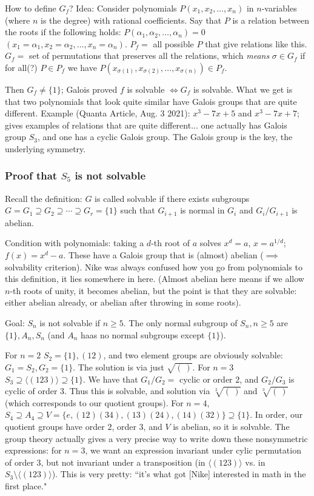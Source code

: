 \documentclass{article}
\theoremstyle{plain}
\theoremstyle{remark}
\begin{document}
How to define $G_f$?
Idea: Consider polynomials $P(x_1,x_2,\dots,x_n)$ in $n$-variables
(where $n$ is the degree) with rational coefficients.
Say that $P$ is a relation between the roots if the following holds:
$P(\alpha_1,\alpha_2,\dots,\alpha_n) = 0$ $(x_1=\alpha_1,x_2=\alpha_2,\dots,x_n=\alpha_n)$.
$P_f = $ all possible $P$ that give relations like this.
$G_f = $ set of permutations that preserves all the relations,
which \emph{means} $\sigma \in G_f$ if for all(?) $P \in P_f$ we have
$P(x_{\sigma(1)},x_{\sigma(2)},\dots,x_{\sigma(n)}) \in P_f$.

Then $G_f \neq \{1\}$; Galois proved $f$ is solvable $\iff G_f$ is solvable.
What we get is that two polynomials that look quite similar have
Galois groups that are quite different.
Example (Quanta Article, Aug. 3 2021): $x^3 - 7x + 5$ and $x^3 - 7x + 7$;
gives examples of relations that are quite different...
one actually has Galois group $S_3$, and one has a cyclic Galois group.
The Galois group is the key, the underlying symmetry.

\subsubsection{Proof that $S_5$ is not solvable}
Recall the definition: $G$ is called solvable if there exists subgroups
$G = G_1 \supseteq G_2 \supseteq \cdots \supseteq G_r = \{1\}$
such that $G_{i+1}$ is normal in $G_i$ and $G_i/G_{i+1}$ is abelian.

Condition with polynomials: taking a $d$-th root of $a$ solves $x^d = a$, $x = a^{1/d}$; $f(x) = x^d - a$.
These have a Galois group that is (almost) abelian ($\implies$ solvability criterion).
Nike was always confused how you go from polynomials to this definition,
it lies somewhere in here.
(Almost abelian here means if we allow $n$-th roots of unity, it becomes abelian,
but the point is that they are solvable:
either abelian already, or abelian after throwing in some roots).

Goal: $S_n$ is not solvable if $n \geq 5$.
The only normal subgroup of $S_n, n \geq 5$ are $\{1\}, A_n, S_n$
(and $A_n$ haas no normal subgroups except $\{1\}$).

For $n=2$ $S_2 = \{1\}, (12)$, and two element groups are obviously solvable:
$G_1 = S_2, G_2 = \{1\}$.
The solution is via just $\sqrt{(~)}$.
For $n=3$ $S_3 \supseteq \langle (123)\rangle \supseteq \{1\}$.
We have that $G_1/G_2 = $ cyclic or order $2$,
and $G_2/G_3$ is cyclic of order $3$.
Thus this is solvable,
and solution via $\sqrt[2]{(~)}$ and $\sqrt[3]{(~)}$
(which corresponds to our quotient groups).
For $n=4$, $S_4 \supseteq A_4 \supseteq V = \{e, (12)(34), (13)(24), (14)(32)\} \supseteq \{1\}$.
In order, our quotient groups have order $2$, order $3$, and $V$ is abelian,
so it is solvable.
The group theory actually gives a very precise way to write down
these nonsymmetric expressions:
for $n=3$, we want an expression invariant under cylic permutation of order $3$,
but not invariant under a transposition (in $\langle (123)\rangle$
vs. in $S_3\setminus \langle (123)\rangle$).
This is very pretty: ``it's what got [Nike] interested in math in the first place."
\end{document}
